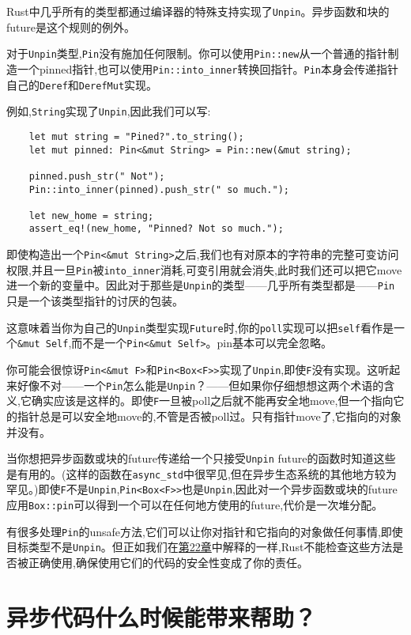 Rust中几乎所有的类型都通过编译器的特殊支持实现了\texttt{Unpin}。异步函数和块的future是这个规则的例外。

对于\texttt{Unpin}类型,\texttt{Pin}没有施加任何限制。你可以使用\texttt{Pin::new}从一个普通的指针制造一个pinned指针,也可以使用\texttt{Pin::into\_inner}转换回指针。\texttt{Pin}本身会传递指针自己的\texttt{Deref}和\texttt{DerefMut}实现。

例如,\texttt{String}实现了\texttt{Unpin},因此我们可以写:
\begin{verbatim}
    let mut string = "Pined?".to_string();
    let mut pinned: Pin<&mut String> = Pin::new(&mut string);

    pinned.push_str(" Not");
    Pin::into_inner(pinned).push_str(" so much.");

    let new_home = string;
    assert_eq!(new_home, "Pinned? Not so much.");
\end{verbatim}

即使构造出一个\texttt{Pin<\&mut String>}之后,我们也有对原本的字符串的完整可变访问权限,并且一旦\texttt{Pin}被\texttt{into\_inner}消耗,可变引用就会消失,此时我们还可以把它move进一个新的变量中。因此对于那些是\texttt{Unpin}的类型——几乎所有类型都是——\texttt{Pin}只是一个该类型指针的讨厌的包装。

这意味着当你为自己的\texttt{Unpin}类型实现\texttt{Future}时,你的\texttt{poll}实现可以把\texttt{self}看作是一个\texttt{\&mut Self},而不是一个\texttt{Pin<\&mut Self>}。pin基本可以完全忽略。

你可能会很惊讶\texttt{Pin<\&mut F>}和\texttt{Pin<Box<F>>}实现了\texttt{Unpin},即使\texttt{F}没有实现。这听起来好像不对——一个\texttt{Pin}怎么能是\texttt{Unpin}？——但如果你仔细想想这两个术语的含义,它确实应该是这样的。即使\texttt{F}一旦被poll之后就不能再安全地move,但一个指向它的指针总是可以安全地move的,不管是否被poll过。只有指针move了,它指向的对象并没有。

当你想把异步函数或块的future传递给一个只接受\texttt{Unpin} future的函数时知道这些是有用的。(这样的函数在\texttt{async\_std}中很罕见,但在异步生态系统的其他地方较为罕见。)即使\texttt{F}不是\texttt{Unpin},\texttt{Pin<Box<F>>}也是\texttt{Unpin},因此对一个异步函数或块的future应用\texttt{Box::pin}可以得到一个可以在任何地方使用的future,代价是一次堆分配。

有很多处理\texttt{Pin}的unsafe方法,它们可以让你对指针和它指向的对象做任何事情,即使目标类型不是\texttt{Unpin}。但正如我们在\hyperref[ch22]{第22章}中解释的一样,Rust不能检查这些方法是否被正确使用,确保使用它们的代码的安全性变成了你的责任。

\section{异步代码什么时候能带来帮助？}

